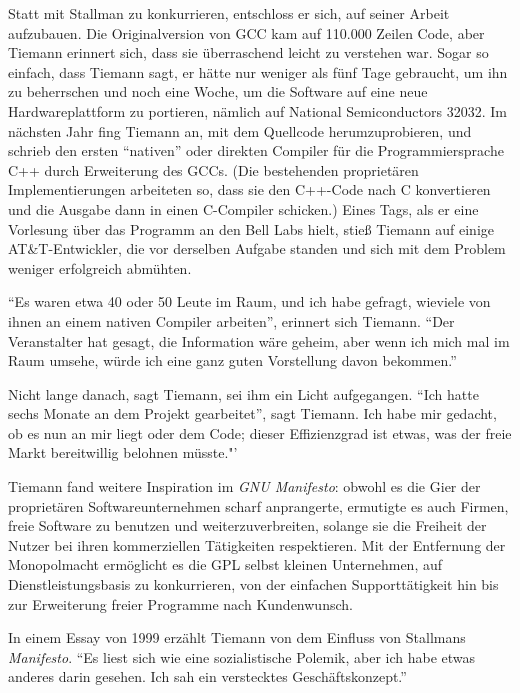 Statt mit Stallman zu konkurrieren, entschloss er sich, auf seiner Arbeit aufzubauen. Die Originalversion von GCC kam auf 110.000 Zeilen Code, aber Tiemann erinnert sich, dass sie überraschend leicht zu verstehen war. Sogar so einfach, dass Tiemann sagt, er hätte nur weniger als fünf Tage gebraucht, um ihn zu beherrschen und noch eine Woche, um die Software auf eine neue Hardwareplattform zu portieren, nämlich auf National Semiconductors 32032. Im nächsten Jahr fing Tiemann an, mit dem Quellcode herumzuprobieren, und schrieb den ersten "`nativen"' oder direkten Compiler für die Programmiersprache C++ durch Erweiterung des GCCs. (Die bestehenden proprietären Implementierungen arbeiteten so, dass sie den C++-Code nach C konvertieren und die Ausgabe dann in einen C-Compiler schicken.) Eines Tags, als er eine Vorlesung über das Programm an den Bell Labs hielt, stieß Tiemann auf einige AT\&T-Entwickler, die vor derselben Aufgabe standen und sich mit dem Problem weniger erfolgreich abmühten.

"`Es waren etwa 40 oder 50 Leute im Raum, und ich habe gefragt, wieviele von ihnen an einem nativen Compiler arbeiten"', erinnert sich Tiemann. "`Der Veranstalter hat gesagt, die Information wäre geheim, aber wenn ich mich mal im Raum umsehe, würde ich eine ganz guten Vorstellung davon bekommen."'

Nicht lange danach, sagt Tiemann, sei ihm ein Licht aufgegangen. "`Ich hatte sechs Monate an dem Projekt gearbeitet"', sagt Tiemann. Ich habe mir gedacht, ob es nun an mir liegt oder dem Code; dieser Effizienzgrad ist etwas, was der freie Markt bereitwillig belohnen müsste."'

Tiemann fand weitere Inspiration im \textit{GNU Manifesto}: obwohl es die Gier der proprietären Softwareunternehmen scharf anprangerte, ermutigte es auch Firmen, freie Software zu benutzen und weiterzuverbreiten, solange sie die Freiheit der Nutzer bei ihren kommerziellen Tätigkeiten respektieren. Mit der Entfernung der Monopolmacht ermöglicht es die GPL selbst kleinen Unternehmen, auf Dienstleistungsbasis zu konkurrieren, von der einfachen Supporttätigkeit hin bis zur Erweiterung freier Programme nach Kundenwunsch.

In einem Essay von 1999 erzählt Tiemann von dem Einfluss von Stallmans \textit{Manifesto}. "`Es liest sich wie eine sozialistische Polemik, aber ich habe etwas anderes darin gesehen. Ich sah ein verstecktes Geschäftskonzept."'

